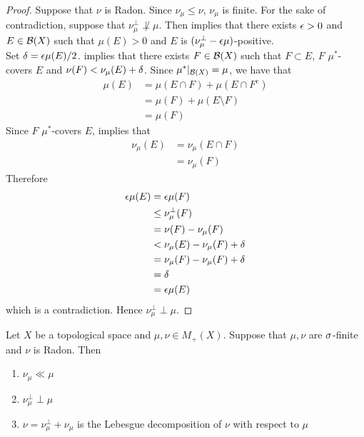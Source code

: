 \documentclass{book}
\begin{document}
	\begin{proof}
		Suppose that $\nu$ is Radon. Since $\nu_{\mu} \leq \nu$, $\nu_{\mu}$ is finite. For the sake of contradiction, suppose that $\nu_{\mu}^{\perp} \not \perp \mu$. Then  implies that there exists $\epsilon >0$ and $E \in \mathcal{B}(X)$ such that $\mu(E) > 0$ and $E$ is $(\nu_{\mu}^{\perp} - \epsilon \mu)$-positive. \\ 
		Set $\delta = \epsilon \mu(E)/2$.  implies that there exists $F \in \mathcal{B}(X)$ such that $F \subset E$, $F$ $\mu^*$-covers $E$ and $\nu(F) < \nu_{\mu}(E) + \delta$. Since $\mu^*|_{\mathcal{B}(X)} = \mu$, we have that 
		\begin{align*}
			\mu(E)
			& = \mu(E \cap F) + \mu(E \cap F^c) \\
			& = \mu(F) + \mu(E \setminus F) \\
			& = \mu(F)
		\end{align*}
		Since $F$ $\mu^*$-covers $E$,  implies that 
		\begin{align*}
			\nu_{\mu}(E)
			& = \nu_{\mu}(E \cap F) \\
			& = \nu_{\mu}(F)
		\end{align*}
		Therefore
		\begin{align*}
			\epsilon \mu(E)
			& = \epsilon \mu(F) \\
			& \leq \nu_{\mu}^{\perp}(F) \\
			& = \nu(F) - \nu_{\mu}(F) \\
			& < \nu_{\mu}(E) - \nu_{\mu}(F) + \delta \\
			& = \nu_{\mu}(F) - \nu_{\mu}(F) + \delta \\
			& = \delta \\
			& = \epsilon \mu(E)
		\end{align*} 
		which is a contradiction. Hence $\nu_{\mu}^{\perp} \perp \mu$. 
	\end{proof}
	
	\begin{ex} 
		Let $X$ be a topological space and $\mu, \nu \in M_+(X)$. Suppose that $\mu,\nu$ are $\sigma$-finite and $\nu$ is Radon. Then 
		\begin{enumerate}
			\item $\nu_{\mu} \ll \mu$
			\item $\nu_{\mu}^{\perp} \perp \mu$
			\item $\nu = \nu_{\mu}^{\perp} + \nu_{\mu}$ is the Lebesgue decomposition of $\nu$ with respect to $\mu$
		\end{enumerate}
	\end{ex}
	
\end{document}
